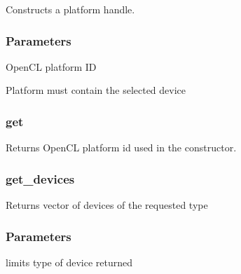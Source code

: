 \documentclass[letterpaper,10pt,english]{sphinxmanual}
\begin{document}
Constructs a platform handle.
\subsubsection*{Parameters}

\begin{DUlineblock}{0em}
\item[]  \sphinxhyphen{} OpenCL platform ID
\item[]  \sphinxhyphen{}  Platform must contain the selected device
\end{DUlineblock}


\subsubsection{get}
\label{\detokenize{programming-interface/runtime/platform:get}}
\begin{sphinxVerbatim}[commandchars=\\\{\}]
  
\end{sphinxVerbatim}

Returns OpenCL platform id used in the constructor.


\subsubsection{get\_devices}
\label{\detokenize{programming-interface/runtime/platform:get-devices}}
\begin{sphinxVerbatim}[commandchars=\\\{\}]
 
      
\end{sphinxVerbatim}

Returns vector of devices of the requested type
\subsubsection*{Parameters}

\begin{DUlineblock}{0em}
\item[]  \sphinxhyphen{} limits type of device returned
\end{DUlineblock}
\end{document}
